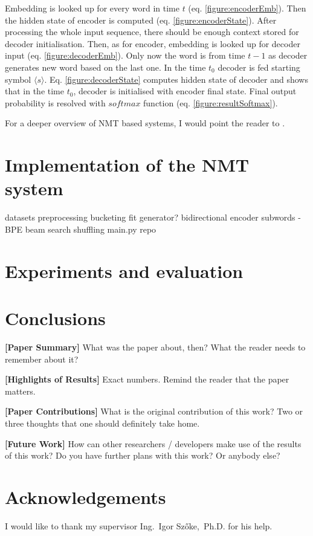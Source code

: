 \documentclass{ExcelAtFIT}
\begin{document}
Embedding is looked up for every word in time $t$ (eq. \ref{figure:encoderEmb}). Then the hidden state of encoder is computed (eq. \ref{figure:encoderState}). After processing the whole input sequence, there should be enough context stored for decoder initialisation. Then, as for encoder, embedding is looked up for decoder input (eq. \ref{figure:decoderEmb}). Only now the word is from time $t - 1$ as decoder generates new word based on the last one. In the time $t_0$ decoder is fed starting symbol $\langle s \rangle$. Eq. \ref{figure:decoderState} computes hidden state of decoder and shows that in the time $t_0$, decoder is initialised with encoder final state. Final output probability is resolved with $softmax$ function (eq. \ref{figure:resultSoftmax}).

For a deeper overview of NMT based systems, I would point the reader to \cite{nmtTutorial}.

\section{Implementation of the NMT system}

datasets
preprocessing
bucketing
fit generator?
bidirectional encoder
subwords - BPE
beam search
shuffling
main.py repo


\section{Experiments and evaluation}

\section{Conclusions}
\label{sec:Conclusions}

\textbf{[Paper Summary]} What was the paper about, then? What the reader needs to remember about it?

\textbf{[Highlights of Results]} Exact numbers. Remind the reader that the paper matters.


\textbf{[Paper Contributions]} What is the original contribution of this work? Two or three thoughts that one should definitely take home.


\textbf{[Future Work]} How can other researchers / developers make use of the results of this work?  Do you have further plans with this work? Or anybody else?


\section*{Acknowledgements}
I would like to thank my supervisor Ing.~Igor Szőke,~Ph.D. for his help.





\end{document}
